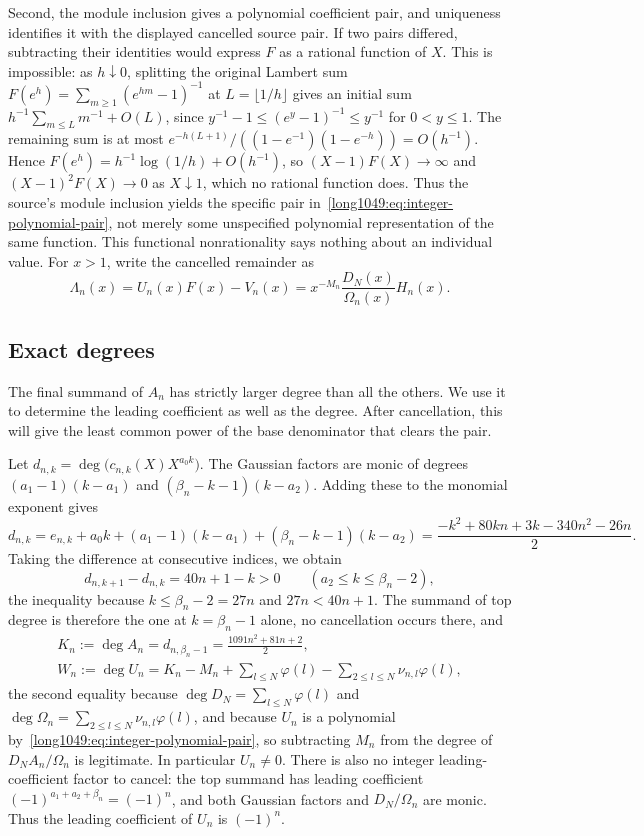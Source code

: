 \documentclass[11pt]{article}
\begin{document}
Second, the module inclusion gives a polynomial coefficient pair,
and uniqueness identifies it with the displayed cancelled source pair.
If two pairs differed, subtracting their identities would express $F$
as a rational function of $X$. This is impossible: as $h\downarrow0$,
splitting the original Lambert sum $F(e^h)=\sum_{m\ge1}(e^{hm}-1)^{-1}$
at $L=\lfloor1/h\rfloor$ gives an initial sum
$h^{-1}\sum_{m\le L}m^{-1}+O(L)$, since
$y^{-1}-1\le(e^y-1)^{-1}\le y^{-1}$ for $0<y\le1$.
The remaining sum is at most
$e^{-h(L+1)}/((1-e^{-1})(1-e^{-h}))=O(h^{-1})$.  Hence
$F(e^h)=h^{-1}\log(1/h)+O(h^{-1})$, so
$(X-1)F(X)\to\infty$ and $(X-1)^{2}F(X)\to0$ as $X\downarrow1$, which no
rational function does. Thus the source's module inclusion yields the
specific pair in~\eqref{long1049:eq:integer-polynomial-pair}, not merely
some unspecified polynomial representation of the same function.
This functional nonrationality says nothing about an individual value.
For $x>1$, write the cancelled remainder as
\[
 \Lambda_n(x)=U_n(x)F(x)-V_n(x)
 =x^{-M_n}\frac{D_N(x)}{\Omega_n(x)}H_n(x).
\]

\subsection{Exact degrees}\label{long1049:sec:degrees}

The final summand of $A_n$ has strictly larger degree than all the
others. We use it to determine the leading coefficient as well as the
degree. After cancellation, this will give the least common power
of the base denominator that clears the pair.

Let $d_{n,k}=\deg\bigl(c_{n,k}(X)X^{a_0k}\bigr)$. The Gaussian factors
are monic of degrees $(a_1-1)(k-a_1)$ and
$(\beta_n-k-1)(k-a_2)$. Adding these to the monomial exponent gives
\[
 d_{n,k}=e_{n,k}+a_0k+(a_1-1)(k-a_1)+(\beta_n-k-1)(k-a_2)
 =\frac{-k^{2}+80kn+3k-340n^{2}-26n}{2}.
\]
Taking the difference at consecutive indices, we obtain
\[
 d_{n,k+1}-d_{n,k}=40n+1-k>0\qquad(a_2\le k\le\beta_n-2),
\]
the inequality because $k\le\beta_n-2=27n$ and $27n<40n+1$.  The summand of
top degree is therefore the one at $k=\beta_n-1$ alone, no cancellation occurs
there, and
\begin{equation}\label{long1049:eq:exact-degree}
 \begin{gathered}
 K_n:=\deg A_n=d_{n,\beta_n-1}=\frac{1091n^{2}+81n+2}{2},
 \\
 W_n:=\deg U_n=K_n-M_n+\sum_{l\le N}\varphi(l)-\sum_{2\le l\le N}\nu_{n,l}\varphi(l),
\end{gathered}
\end{equation}
the second equality because $\deg D_N=\sum_{l\le N}\varphi(l)$ and
$\deg\Omega_n=\sum_{2\le l\le N}\nu_{n,l}\varphi(l)$, and because
$U_n$ is a polynomial by~\eqref{long1049:eq:integer-polynomial-pair}, so subtracting
$M_n$ from the degree of $D_NA_n/\Omega_n$ is legitimate.  In particular
$U_n\ne0$. There is also no integer leading-coefficient factor to
cancel: the top summand has leading coefficient
$(-1)^{a_1+a_2+\beta_n}=(-1)^n$, and both Gaussian factors and
$D_N/\Omega_n$ are monic. Thus the leading coefficient of $U_n$ is
$(-1)^n$.
\end{document}
